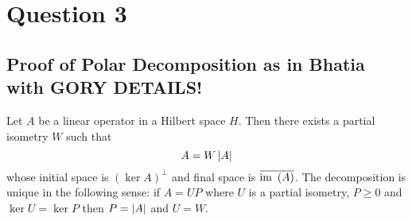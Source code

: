 \section{Question 3}
\horz
\subsection{Proof of Polar Decomposition as in Bhatia with GORY DETAILS!}
\begin{theorem}
    Let $A$ be a linear operator in a Hilbert space $H$. Then there exists a partial isometry $W$ such that 
    \begin{equation*}
	A=W\left\lvert A \right\rvert
    \end{equation*}
    whose initial space is $(\ker A)^{\perp}$ and final space is $\overline{{\text{im }} \left( A \right)}$. The decomposition is unique in the following sense: if $A=UP$ where $U$ is a partial isometry, $P\ge 0$ and $\ker U =\ker P$ then $P=\left\lvert A \right\rvert$ and $U=W$.
    \label{thm:pdt}
\end{theorem}
